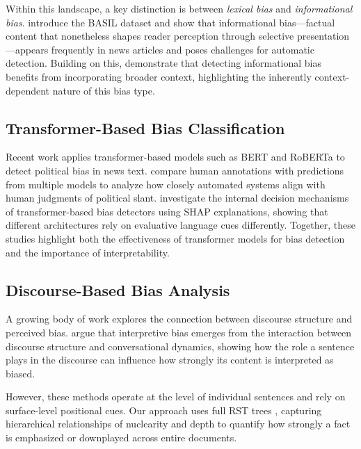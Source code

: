 \documentclass[11pt]{article}
\begin{document}
Within this landscape, a key distinction is between \emph{lexical bias} and \emph{informational bias}. \citet{fan2019plainsightmediabias} introduce the BASIL dataset and show that informational bias---factual content that nonetheless shapes reader perception through selective presentation---appears frequently in news articles and poses challenges for automatic detection. Building on this, \citet{berg2020contextinformationalbiasdetection} demonstrate that detecting informational bias benefits from incorporating broader context, highlighting the inherently context-dependent nature of this bias type.

\subsection{Transformer-Based Bias Classification}

Recent work applies transformer-based models such as BERT and RoBERTa to detect political bias in news text. \citet{banik2025bridginghumanmodelperspectives} compare human annotations with predictions from multiple models to analyze how closely automated systems align with human judgments of political slant. \citet{ghosh2025explainingnewsbiasdetection} investigate the internal decision mechanisms of transformer-based bias detectors using SHAP explanations, showing that different architectures rely on evaluative language cues differently. Together, these studies highlight both the effectiveness of transformer models for bias detection and the importance of interpretability.

\subsection{Discourse-Based Bias Analysis}

A growing body of work explores the connection between discourse structure and perceived bias. \citet{asher2018biassemanticdiscourseinterpretation} argue that interpretive bias emerges from the interaction between discourse structure and conversational dynamics, showing how the role a sentence plays in the discourse can influence how strongly its content is interpreted as biased.

However, these methods operate at the level of individual sentences and rely on surface-level positional cues. Our approach uses full RST trees \citep{nguyen2021rstparsingscratch}, capturing hierarchical relationships of nuclearity and depth to quantify how strongly a fact is emphasized or downplayed across entire documents.
\end{document}
